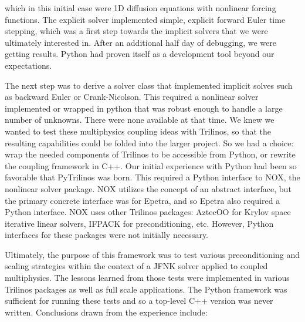\documentclass[11pt]{article}
\begin{document}
which in this initial case were 1D diffusion equations with nonlinear forcing functions.  The explicit solver implemented simple, explicit forward Euler time stepping, which was a first step towards the implicit solvers that we were ultimately interested in.  After an additional half day of debugging, we were getting results.  Python had proven itself as a development tool beyond our expectations.

The next step was to derive a solver class that implemented implicit solves such as backward Euler or Crank-Nicolson.  This required a nonlinear solver implemented or wrapped in python that was robust enough to handle a large number of unknowns.  There were none available at that time.  We knew we wanted to test these multiphysics coupling ideas with Trilinos, so that the resulting capabilities could be folded into the larger project.  So we had a choice: wrap the needed components of Trilinos to be accessible from Python, or rewrite the coupling framework in C++.  Our initial experience with Python had been so favorable that PyTrilinos was born.  This required a Python interface to NOX, the nonlinear solver package.  NOX utilizes the concept of an abstract interface, but the primary concrete interface was for Epetra, and so Epetra also required a Python interface.  NOX uses other Trilinos packages: AztecOO for Krylov space iterative linear solvers, IFPACK for preconditioning, etc.  However, Python interfaces for these packages were not initially necessary.

Ultimately, the purpose of this framework was to test various preconditioning and scaling strategies within the context of a JFNK solver applied to coupled multiphysics.  The lessons learned from those tests were implemented in various Trilinos packages as well as full scale applications.  The Python framework was sufficient for running these tests and so a top-level C++ version was never written.  Conclusions drawn from the experience include:
\end{document}

